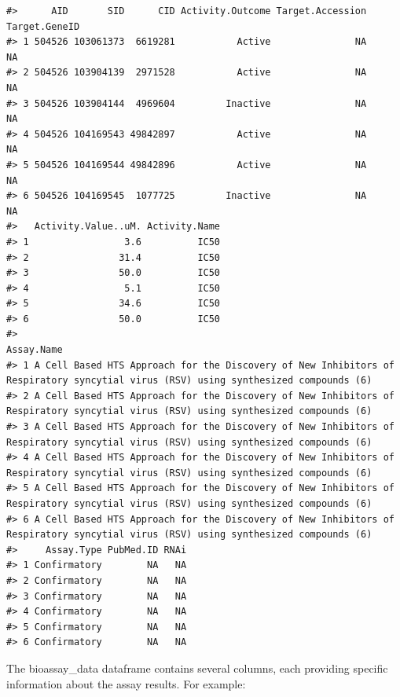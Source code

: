\begin{verbatim}
#>      AID       SID      CID Activity.Outcome Target.Accession Target.GeneID
#> 1 504526 103061373  6619281           Active               NA            NA
#> 2 504526 103904139  2971528           Active               NA            NA
#> 3 504526 103904144  4969604         Inactive               NA            NA
#> 4 504526 104169543 49842897           Active               NA            NA
#> 5 504526 104169544 49842896           Active               NA            NA
#> 6 504526 104169545  1077725         Inactive               NA            NA
#>   Activity.Value..uM. Activity.Name
#> 1                 3.6          IC50
#> 2                31.4          IC50
#> 3                50.0          IC50
#> 4                 5.1          IC50
#> 5                34.6          IC50
#> 6                50.0          IC50
#>                                                                                                                           Assay.Name
#> 1 A Cell Based HTS Approach for the Discovery of New Inhibitors of Respiratory syncytial virus (RSV) using synthesized compounds (6)
#> 2 A Cell Based HTS Approach for the Discovery of New Inhibitors of Respiratory syncytial virus (RSV) using synthesized compounds (6)
#> 3 A Cell Based HTS Approach for the Discovery of New Inhibitors of Respiratory syncytial virus (RSV) using synthesized compounds (6)
#> 4 A Cell Based HTS Approach for the Discovery of New Inhibitors of Respiratory syncytial virus (RSV) using synthesized compounds (6)
#> 5 A Cell Based HTS Approach for the Discovery of New Inhibitors of Respiratory syncytial virus (RSV) using synthesized compounds (6)
#> 6 A Cell Based HTS Approach for the Discovery of New Inhibitors of Respiratory syncytial virus (RSV) using synthesized compounds (6)
#>     Assay.Type PubMed.ID RNAi
#> 1 Confirmatory        NA   NA
#> 2 Confirmatory        NA   NA
#> 3 Confirmatory        NA   NA
#> 4 Confirmatory        NA   NA
#> 5 Confirmatory        NA   NA
#> 6 Confirmatory        NA   NA
\end{verbatim}

The bioassay\_data dataframe contains several columns, each providing specific information about the assay results. For example:

